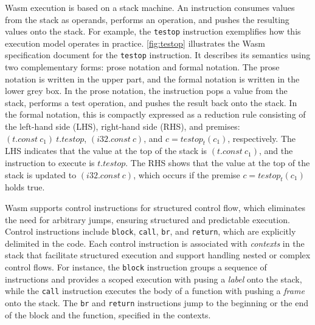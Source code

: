 Wasm execution is based on a stack machine.
An instruction consumes values from the stack as operands, performs an
operation, and pushes the resulting values onto the stack.
For example, the \texttt{testop} instruction exemplifies how this execution
model operates in practice.
\cref{fig:testop} illustrates the Wasm specification document for the
\texttt{testop} instruction.
It describes its semantics using two complementary forms: prose notation and
formal notation.
The prose notation is written in the upper part, and the formal notation is
written in the lower grey box.
In the prose notation, the instruction pops a value from the stack, performs a
test operation, and pushes the result back onto the stack.
In the formal notation, this is compactly expressed as a reduction rule
consisting of the left-hand side (LHS), right-hand side (RHS), and premises:
$(t.const ~ c_1) ~ t.testop$, $(i32.const ~ c)$, and $c = testop_t(c_1)$,
respectively.
The LHS indicates that the value at the top of the stack is $(t.const ~ c_1)$,
and the instruction to execute is $t.testop$.
The RHS shows that the value at the top of the stack is updated to $(i32.const
~ c)$, which occurs if the premise $c = testop_t(c_1)$ holds true.


Wasm supports control instructions for structured control flow, which
eliminates the need for arbitrary jumps, ensuring structured and predictable
execution.
Control instructions include \texttt{block}, \texttt{call}, \texttt{br}, and
\texttt{return}, which are explicitly delimited in the code.
Each control instruction is associated with \textit{contexts} in the stack that
facilitate structured execution and support handling nested or complex control
flows.
For instance, the \texttt{block} instruction groups a sequence of instructions
and provides a scoped execution with pusing a \textit{label} onto the stack,
while the \texttt{call} instruction executes the body of a function with
pushing a \textit{frame} onto the stack.
The \texttt{br} and \texttt{return} instructions jump to the beginning or
the end of the block and the function, specified in the contexts.
